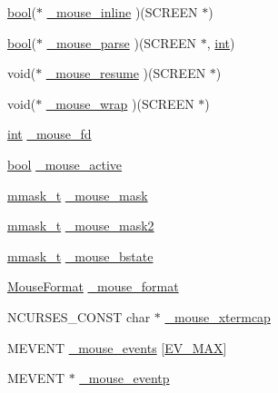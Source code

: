 \begin{DoxyCompactItemize}
\item 
\hyperlink{term__entry_8h_a002004ba5d663f149f6c38064926abac}{bool}($\ast$ \hyperlink{structscreen_a0fa3b358adb26f6a97b0194af99877a5}{\-\_\-mouse\-\_\-inline} )(S\-C\-R\-E\-E\-N $\ast$)
\item 
\hyperlink{term__entry_8h_a002004ba5d663f149f6c38064926abac}{bool}($\ast$ \hyperlink{structscreen_aff2bbadccbb53a75540e982856eb8b65}{\-\_\-mouse\-\_\-parse} )(S\-C\-R\-E\-E\-N $\ast$, \hyperlink{term__entry_8h_ad65b480f8c8270356b45a9890f6499ae}{int})
\item 
void($\ast$ \hyperlink{structscreen_a5dcc72afb44dd01782119aa4e038f819}{\-\_\-mouse\-\_\-resume} )(S\-C\-R\-E\-E\-N $\ast$)
\item 
void($\ast$ \hyperlink{structscreen_a1327b180c31e1afba9ee1daa90bd2f4f}{\-\_\-mouse\-\_\-wrap} )(S\-C\-R\-E\-E\-N $\ast$)
\item 
\hyperlink{term__entry_8h_ad65b480f8c8270356b45a9890f6499ae}{int} \hyperlink{structscreen_a1fa2fee5a4611ef255875a48c9cfde7c}{\-\_\-mouse\-\_\-fd}
\item 
\hyperlink{term__entry_8h_a002004ba5d663f149f6c38064926abac}{bool} \hyperlink{structscreen_a156c3f480cf678088d6de82fed62cf91}{\-\_\-mouse\-\_\-active}
\item 
\hyperlink{curses_8priv_8h_a9c1f36ef87f96fc8d1040ffaeff3a930}{mmask\-\_\-t} \hyperlink{structscreen_ac5f35129912f4053072ac7af517b9548}{\-\_\-mouse\-\_\-mask}
\item 
\hyperlink{curses_8priv_8h_a9c1f36ef87f96fc8d1040ffaeff3a930}{mmask\-\_\-t} \hyperlink{structscreen_aeb83d9914926cc1a2beaea4c9a56ed8d}{\-\_\-mouse\-\_\-mask2}
\item 
\hyperlink{curses_8priv_8h_a9c1f36ef87f96fc8d1040ffaeff3a930}{mmask\-\_\-t} \hyperlink{structscreen_a4c20b53c0fed27c64361ca9995799562}{\-\_\-mouse\-\_\-bstate}
\item 
\hyperlink{curses_8priv_8h_adc7c00611c5ff680f262f147c620d175}{Mouse\-Format} \hyperlink{structscreen_aae28128032241f2d1db6ec21354af46c}{\-\_\-mouse\-\_\-format}
\item 
N\-C\-U\-R\-S\-E\-S\-\_\-\-C\-O\-N\-S\-T char $\ast$ \hyperlink{structscreen_ade184a9c8426fea2004500d841f3c447}{\-\_\-mouse\-\_\-xtermcap}
\item 
M\-E\-V\-E\-N\-T \hyperlink{structscreen_a800a83e200034a7803bec13e1d382e7a}{\-\_\-mouse\-\_\-events} \mbox{[}\hyperlink{curses_8priv_8h_ac6969be6eb3938283645e67791af546b}{E\-V\-\_\-\-M\-A\-X}\mbox{]}
\item 
M\-E\-V\-E\-N\-T $\ast$ \hyperlink{structscreen_a2b5b9ce80042052957b0584ea97ffb78}{\-\_\-mouse\-\_\-eventp}

\end{DoxyCompactItemize}

